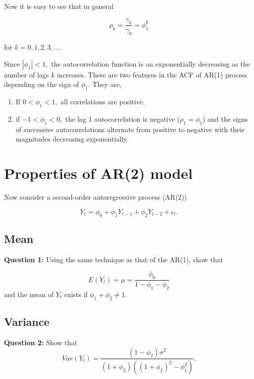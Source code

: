\documentclass[
  11pt,
  a4paper,
]{report}
\begin{document}
Now it is easy to see that in general

\begin{equation}
\rho_k = \frac{\gamma_k}{\gamma_0}=\phi_1^k 
\end{equation}

for \(k=0, 1, 2, 3, ...\).

Since \(|\phi_1| < 1,\) the autocorrelation function is an exponentially
decreasing as the number of lags \(k\) increases. There are two features
in the ACF of AR(1) process depending on the sign of \(\phi_1\). They
are,

\begin{enumerate}
\def\labelenumi{\arabic{enumi}.}
\item
  If \(0 < \phi_1 < 1,\) all correlations are positive.
\item
  if \(-1 < \phi_1 < 0,\) the lag 1 autocorrelation is negative
  (\(\rho_1=\phi_1\)) and the signs of successive autocorrelations
  alternate from positive to negative with their magnitudes decreasing
  exponentially.
\end{enumerate}

\section{Properties of AR(2) model}\label{properties-of-ar2-model}

Now consider a second-order autoregressive process (AR(2))

\begin{equation}
Y_t=\phi_0+\phi_1Y_{t-1}+\phi_2Y_{t-2}+\epsilon_t.
\end{equation}

\subsection{Mean}\label{mean-1}

\textbf{Question 1:} Using the same technique as that of the AR(1), show
that

\[E(Y_t) = \mu = \frac{\phi_0}{1-\phi_1 - \phi_2}\] and the mean of
\(Y_t\) exists if \(\phi_1 + \phi_2 \neq 1\).

\subsection{Variance}\label{variance}

\textbf{Question 2:} Show that
\[Var(Y_t) = \frac{(1-\phi_2)\sigma^2}{(1+\phi_2)((1+\phi_2)^2-\phi_1^2)}.\]
\end{document}
